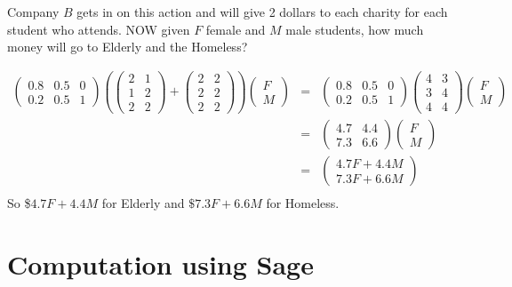 \begin{example}
Company $B$ gets in on this action and will give 2 dollars to each charity for each student who attends.  NOW given $F$ female and $M$ male students, how much money will go to Elderly and the Homeless?

\begin{eqnarray*}
\begin{pmatrix} 0.8 & 0.5 & 0 \\ 0.2 & 0.5 & 1 \end{pmatrix} \left( \begin{pmatrix} 2 & 1 \\ 1 & 2 \\ 2 & 2\end{pmatrix} + \begin{pmatrix} 2 & 2 \\ 2 & 2 \\ 2 & 2\end{pmatrix}   \right)\begin{pmatrix} F\\M \end{pmatrix}&=&\begin{pmatrix} 0.8 & 0.5 & 0 \\ 0.2 & 0.5 & 1 \end{pmatrix} \begin{pmatrix} 4 & 3 \\ 3 & 4 \\ 4 & 4\end{pmatrix} \begin{pmatrix} F\\M \end{pmatrix}\\
&=&\begin{pmatrix} 4.7 & 4.4 \\ 7.3 &  6.6 \end{pmatrix}\begin{pmatrix} F\\M \end{pmatrix}\\
&=&\begin{pmatrix} 4.7F+4.4M\\ 7.3F+6.6M \end{pmatrix}\\
\end{eqnarray*}
So \$$4.7 F+4.4M$ for Elderly and $\$7.3 F+6.6M$ for Homeless.
\end{example}

\section{Computation using Sage}

